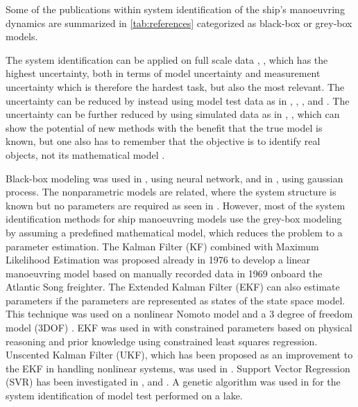 Some of the publications within system identification of the ship's manoeuvring dynamics are summarized in \autoref{tab:references} categorized as black-box or grey-box models.
 
\noindent The system identification can be applied on full scale data \cite{astrom_identification_1976}, \cite{perera_system_2015}, \cite{revestido_herrero_two-step_2012} which has the highest uncertainty, both in terms of model uncertainty and measurement uncertainty which is therefore the hardest task, but also the most relevant. The uncertainty can be reduced by instead using model test data as in \cite{araki_estimating_2012}, \cite{he_nonparametric_2022}, \cite{xue_identification_2021}, \cite{miller_ship_2021} and \cite{luo_parameter_2016} . The uncertainty can be further reduced by using simulated data as in \cite{shi_identification_2009}, \cite{zhu_parameter_2017}, \cite{wang_parameter_2021} which can show the potential of new methods with the benefit that the true model is known, but one also has to remember that the objective is to identify real objects, not its mathematical model \cite{miller_ship_2021}.

Black-box modeling was used in \cite{he_nonparametric_2022}, using neural network, and in \cite{xue_identification_2021}, using gaussian process. The nonparametric models are related, where the system structure is known but no parameters are required as seen in \cite{pongduang_nonparametric_2020}. However, most of the system identification methods for ship manoeuvring models use the grey-box modeling by assuming a predefined mathematical model, which reduces the problem to a parameter estimation.
The Kalman Filter (KF) combined with Maximum Likelihood Estimation was proposed already in 1976 \cite{astrom_identification_1976} to develop a linear manoeuvring model based on manually recorded data in 1969 onboard the Atlantic Song freighter. The Extended Kalman Filter (EKF) can also estimate parameters if the parameters are represented as states of the state space model. This technique was used on a nonlinear Nomoto model \cite{perera_system_2015} and a 3 degree of freedom model (3DOF) \cite{shi_identification_2009}. EKF was used in \cite{araki_estimating_2012} with constrained parameters based on physical reasoning and prior knowledge using constrained least squares regression. Unscented Kalman Filter (UKF), which has been proposed as an improvement to the EKF in handling nonlinear systems, was used in \cite{revestido_herrero_two-step_2012}.
Support Vector Regression (SVR) has been investigated in \cite{zhu_parameter_2017}, \cite{wang_parameter_2021} and \cite{luo_parameter_2016}. A genetic algorithm was used in \cite{miller_ship_2021} for the system identification of model test performed on a lake.






